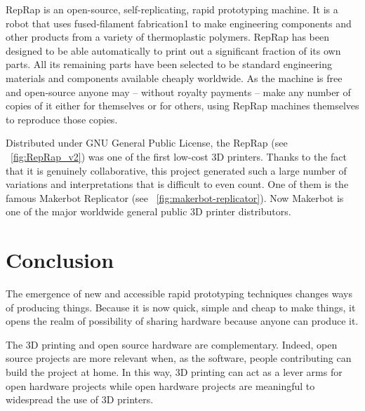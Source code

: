 \begin{formal}
    RepRap is an open-source, self-replicating, rapid prototyping machine. It is a robot that uses fused-filament fabrication1 to make engineering components and other products from a variety of thermoplastic polymers. RepRap has been designed to be able automatically to print out a significant fraction of its own parts. All its remaining parts have been selected to be standard engineering materials and components available cheaply worldwide. As the machine is free and open-source anyone may – without royalty payments – make any number of copies of it either for themselves or for others, using RepRap machines themselves to reproduce those copies.

\end{formal}


\begin{figure}[tb]
\centering
    \hfil
    \caption{}
    \label{fig:RepRap_project}
\end{figure}


Distributed under GNU General Public License, the RepRap (see \figurename~\ref{fig:RepRap_v2}) was one of the first low-cost 3D printers. Thanks to the fact that it is genuinely collaborative, this project generated such a large number of variations and interpretations that is difficult to even count. One of them is the famous Makerbot Replicator (see \figurename~\ref{fig:makerbot-replicator}). Now Makerbot is one of the major worldwide general public 3D printer distributors.



\section{Conclusion}

The emergence of new and accessible rapid prototyping techniques changes ways of producing things. Because it is now quick, simple and cheap to make things, it opens the realm of possibility of sharing hardware because anyone can produce it.

The 3D printing and open source hardware are complementary. Indeed, open source projects are more relevant when, as the software, people contributing can build the project at home. In this way, 3D printing can act as a lever arms for open hardware projects while open hardware projects are meaningful to widespread the use of 3D printers.

